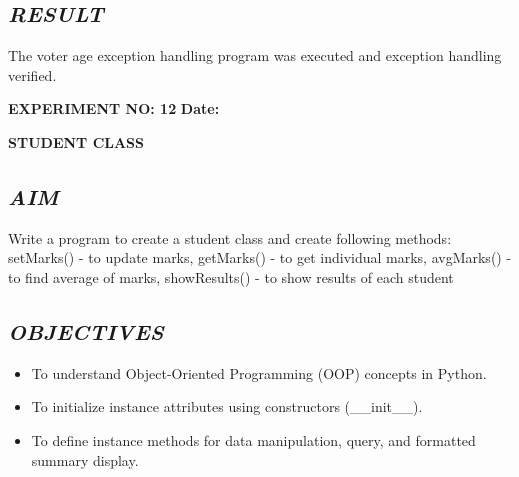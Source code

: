 \documentclass[11pt,a4paper]{article}
\begin{document}
\subsection*{\textit{RESULT}}
The voter age exception handling program was executed and exception handling verified.

\newpage

\noindent
\textbf{\large EXPERIMENT NO: 12} \hfill \textbf{\large Date: \underline{\hspace{3cm}}}

\vspace{0.2cm}
\begin{center}
{\Huge \textbf{\textcolor{navyblue}{STUDENT CLASS}}}
\end{center}
\vspace{0.3cm}

\subsection*{\textit{AIM}}
Write a program to create a student class and create following methods: setMarks() - to update marks, getMarks() - to get individual marks, avgMarks() - to find average of marks, showResults() - to show results of each student

\subsection*{\textit{OBJECTIVES}}
\begin{itemize}
  \item To understand Object-Oriented Programming (OOP) concepts in Python.
  \item To initialize instance attributes using constructors (__init__).
  \item To define instance methods for data manipulation, query, and formatted summary display.
\end{itemize}
\end{document}
